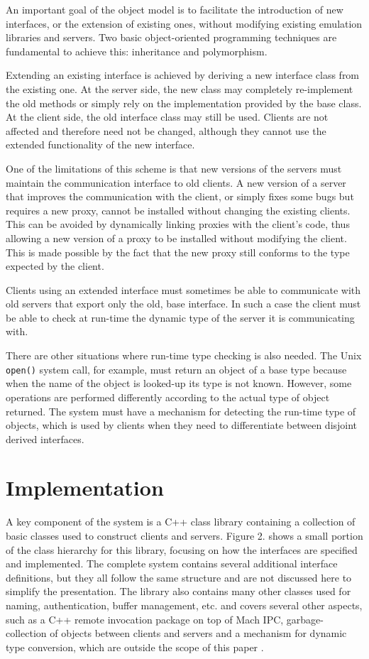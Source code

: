 An important goal of the object model is to facilitate the
introduction of new interfaces, or the extension of existing ones,
without modifying existing emulation libraries and servers. Two basic
object-oriented programming techniques are fundamental to achieve
this: inheritance and polymorphism.

Extending an existing interface is achieved by deriving a new
interface class from the existing one. At the server side, the new
class may completely re-implement the old methods or simply rely on
the implementation provided by the base class. At the client side, the
old interface class may still be used. Clients are not affected and
therefore need not be changed, although they cannot use the extended
functionality of the new interface.

One of the limitations of this scheme is that new versions of the
servers must maintain the communication interface to old clients. A
new version of a server that improves the communication with the
client, or simply fixes some bugs but requires a new proxy, cannot be
installed without changing the existing clients. This can be avoided
by dynamically linking proxies with the client's code, thus allowing a
new version of a proxy to be installed without modifying the client.
This is made possible by the fact that the new proxy still conforms to
the type expected by the client.

Clients using an extended interface must sometimes be able to
communicate with old servers that export only the old, base interface.
In such a case the client must be able to check at run-time the
dynamic type of the server it is communicating with.

There are other situations where run-time type checking is also needed.
The Unix {\tt open()} system call, for example, must return an object
of a base type because when the name of the object is looked-up
its type is not known. However, some operations are performed
differently according to the actual type of object returned. The
system must have a mechanism for detecting the run-time type of
objects, which is used by clients when they need to differentiate
between disjoint derived interfaces.

\section{Implementation}

A key component of the system is a C++ class library containing a
collection of basic classes used to construct clients and servers.
Figure 2. shows a small portion of the class hierarchy for this
library, focusing on how the interfaces are specified and implemented.
The complete system contains several additional interface
definitions, but they all follow the same structure and are not
discussed here to simplify the presentation. The library also contains
many other classes used for naming, authentication, buffer management,
etc. and covers several other aspects, such as a C++ remote invocation
package on top of Mach IPC, garbage-collection of objects between
clients and servers and a mechanism for dynamic type conversion, which
are outside the scope of this paper \cite{Gue91}.

